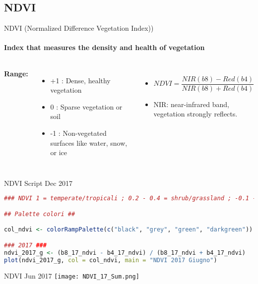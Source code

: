 \documentclass[10pt]{beamer}
\begin{document}
\subsection{NDVI}
\begin{frame}{NDVI (Normalized Difference Vegetation Index))}
    \framesubtitle{Index that measures the density and health of vegetation}
    \begin{columns}
            \textbf{Range:}
            \begin{itemize}
                \item +1 :  Dense, healthy vegetation
                \item \hspace{0.8em}0 : Sparse vegetation or soil
                \item \hspace{0.5em}-1 : Non-vegetated surfaces like water, snow, or ice
            \end{itemize}
            \vfill %
            \begin{itemize}
                \item   \[
                        NDVI = \frac{NIR(b8) - Red(b4)}{NIR(b8) + Red(b4)}
                        \]
                \item \small{NIR: near-infrared band, vegetation strongly reflects.}
            \end{itemize}
            \vfill %
    \end{columns}
\end{frame}

\begin{frame}[fragile]{NDVI Script Dec 2017}
    \begin{lstlisting}[language=R]
### NDVI 1 = temperate/tropicali ; 0.2 - 0.4 = shrub/grassland ; -0.1 - 0.1 = roccia, sabbia, neve ; -1 = acqua ###

## Palette colori ##

col_ndvi <- colorRampPalette(c("black", "grey", "green", "darkgreen")) (100)

### 2017 ###
ndvi_2017_g <- (b8_17_ndvi - b4_17_ndvi) / (b8_17_ndvi + b4_17_ndvi)
plot(ndvi_2017_g, col = col_ndvi, main = "NDVI 2017 Giugno")
    \end{lstlisting}
\end{frame}

\begin{frame}{NDVI Jun 2017}
    \centering
    \texttt{[image: NDVI\_17\_Sum.png]}  
    
\end{frame}
\end{document}
